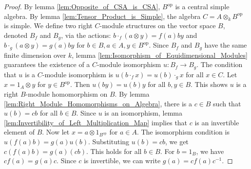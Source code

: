\begin{proof}
    By lemma \ref{lem:Opposite_of_CSA_is_CSA}, $B^{\text{op}}$ is a central simple algebra. By lemma \ref{lem:Tensor_Product_is_Simple}, the algebra $C = A \otimes_k B^{\text{op}}$ is simple.
    We define two right $C$-module structures on the vector space $B$, denoted $B_f$ and $B_g$, via the actions:
    $b \cdot_f (a \otimes y) = f(a) b y$ and $b \cdot_g (a \otimes y) = g(a) b y$ for $b \in B, a \in A, y \in B^{\text{op}}$.
    Since $B_f$ and $B_g$ have the same finite dimension over $k$, lemma \ref{lem:Isomorphism_of_Equidimensional_Modules} guarantees the existence of a $C$-module isomorphism $u: B_f \to B_g$.
    The condition that $u$ is a $C$-module isomorphism is $u(b \cdot_f x) = u(b) \cdot_g x$ for all $x \in C$.
    Let $x = 1_A \otimes y$ for $y \in B^{\text{op}}$. Then $u(b y) = u(b) y$ for all $b, y \in B$. This shows $u$ is a right $B$-module homomorphism on $B$. By lemma \ref{lem:Right_Module_Homomorphisms_on_Algebra}, there is a $c \in B$ such that $u(b) = cb$ for all $b \in B$. Since $u$ is an isomorphism, lemma \ref{lem:Invertibility_of_Left_Multiplication_Map} implies that $c$ is an invertible element of $B$.
    Now let $x = a \otimes 1_{B^{\text{op}}}$ for $a \in A$. The isomorphism condition is $u(f(a)b) = g(a)u(b)$. Substituting $u(b) = cb$, we get $c(f(a)b) = g(a)(cb)$. This holds for all $b \in B$. For $b=1_B$, we have $cf(a) = g(a)c$. Since $c$ is invertible, we can write $g(a) = c f(a) c^{-1}$.
\end{proof}